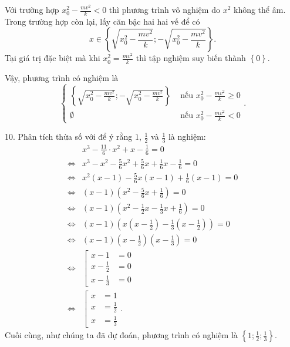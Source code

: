 Với trường hợp $x_0^2 - \frac{mv^2}{k} < 0$ thì phương trình vô nghiệm do $x^2$ không thể âm. Trong trường hợp còn lại, lấy căn bậc hai hai vế để có $$x\in\left\{\sqrt{x_0^2 - \frac{mv^2}{k}}; -\sqrt{x_0^2 - \frac{mv^2}{k}}\right\}.$$ Tại giá trị đặc biệt mà khi $x_0^2 = \frac{mv^2}{k}$ thì tập nghiệm suy biến thành $\left\{0\right\}$.

Vậy, phương trình có nghiệm là 
$$
\boxed{
   \begin{cases}
      \left\{\sqrt{x_0^2 - \frac{mv^2}{k}}; -\sqrt{x_0^2 - \frac{mv^2}{k}}\right\} &\text{ nếu } x_0^2 - \frac{mv^2}{k} \geq 0 \\
      \emptyset &\text{ nếu } x_0^2 - \frac{mv^2}{k} < 0
   \end{cases}.
}
$$

10. Phân tích thừa số với để ý rằng $1$, $\frac{1}{2}$ và $\frac{1}{3}$ là nghiệm:
\begin{align*}
   &x^3 - \frac{11}{6}\cdot x^2 + x - \frac{1}{6} = 0 \\
   \iff &x^3 - x^2 - \frac{5}{6}x^2 + \frac{5}{6}x + \frac{1}{6}x - \frac{1}{6} = 0 \\
   \iff &x^2\left(x - 1\right) - \frac{5}{6}x\left(x - 1\right) + \frac{1}{6}\left(x - 1\right) = 0 \\
   \iff &\left(x - 1\right)\left(x^2 - \frac{5}{6}x + \frac{1}{6}\right) = 0 \\
   \iff &\left(x - 1\right)\left(x^2 - \frac{1}{2}x - \frac{1}{3}x + \frac{1}{6}\right) = 0 \\
   \iff &\left(x - 1\right)\left(x\left(x - \frac{1}{2}\right) - \frac{1}{3}\left(x - \frac{1}{2}\right)\right) = 0 \\
   \iff &\left(x - 1\right)\left(x - \frac{1}{2}\right)\left(x - \frac{1}{3}\right) = 0 \\
   \iff &\left[
      \begin{aligned}
         x - 1 &= 0 \\
         x - \frac{1}{2} &= 0 \\
         x - \frac{1}{3} &= 0
      \end{aligned}
   \right. \\
   \iff &\left[
      \begin{aligned}
         x &= 1 \\
         x &= \frac{1}{2} \\
         x &= \frac{1}{3}
      \end{aligned}
   \right..
\end{align*}
Cuối cùng, như chúng ta đã dự đoán, phương trình có nghiệm là $\boxed{\displaystyle\left\{1; \frac{1}{2}; \frac{1}{3}\right\}}$.

